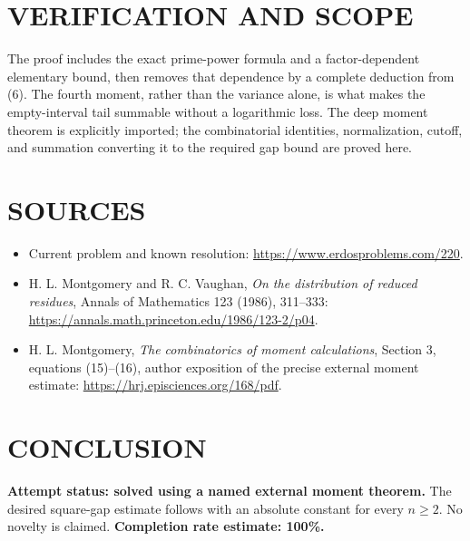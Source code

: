 \section{VERIFICATION AND SCOPE}
The proof includes the exact prime-power formula and a factor-dependent elementary bound, then removes that dependence by a complete deduction from (6). The fourth moment, rather than the variance alone, is what makes the empty-interval tail summable without a logarithmic loss. The deep moment theorem is explicitly imported; the combinatorial identities, normalization, cutoff, and summation converting it to the required gap bound are proved here.

\section{SOURCES}
\begin{itemize}
\item Current problem and known resolution: \url{https://www.erdosproblems.com/220}.
\item H. L. Montgomery and R. C. Vaughan, \emph{On the distribution of reduced residues}, Annals of Mathematics 123 (1986), 311--333: \url{https://annals.math.princeton.edu/1986/123-2/p04}.
\item H. L. Montgomery, \emph{The combinatorics of moment calculations}, Section 3, equations (15)--(16), author exposition of the precise external moment estimate: \url{https://hrj.episciences.org/168/pdf}.
\end{itemize}
\section{CONCLUSION}
\textbf{Attempt status: solved using a named external moment theorem.} The desired square-gap estimate follows with an absolute constant for every $n\geq2$. No novelty is claimed.
\textbf{Completion rate estimate: 100\%.}
